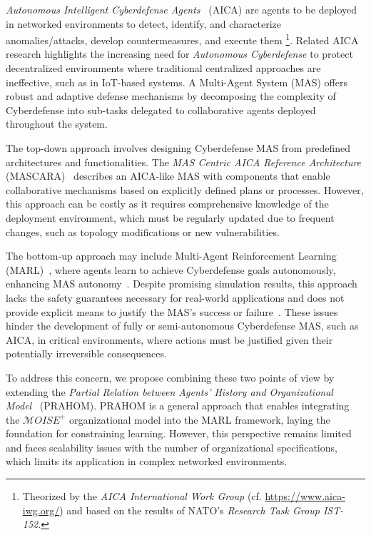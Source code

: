 \documentclass[conference]{IEEEtran}
\begin{document}
\textit{Autonomous Intelligent Cyberdefense Agents}~\cite{Kott2023} (AICA) are agents to be deployed in networked environments to detect, identify, and characterize anomalies/attacks, develop countermeasures, and execute them
%
\footnote{
    Theorized by the \textit{AICA International Work Group} (cf. \url{https://www.aica-iwg.org/}) and based on the results of NATO's \textit{Research Task Group IST-152}.
}.
Related AICA research highlights the increasing need for \textit{Autonomous Cyberdefense} to protect decentralized environments where traditional centralized approaches are ineffective, such as in IoT-based systems. A Multi-Agent System (MAS) offers robust and adaptive defense mechanisms by decomposing the complexity of Cyberdefense into sub-tasks delegated to collaborative agents deployed throughout the system.

The top-down approach involves designing Cyberdefense MAS from predefined architectures and functionalities. The \textit{MAS Centric AICA Reference Architecture} (MASCARA)~\cite{Kott2023} describes an AICA-like MAS with components that enable collaborative mechanisms based on explicitly defined plans or processes. However, this approach can be costly as it requires comprehensive knowledge of the deployment environment, which must be regularly updated due to frequent changes, such as topology modifications or new vulnerabilities.

The bottom-up approach may include Multi-Agent Reinforcement Learning (MARL)~\cite{Albrecht2024}, where agents learn to achieve Cyberdefense goals autonomously, enhancing MAS autonomy~\cite{hammar_stadle4_noms_23}. Despite promising simulation results, this approach lacks the safety guarantees necessary for real-world applications and does not provide explicit means to justify the MAS's success or failure~\cite{dulacarnold2019}. These issues hinder the development of fully or semi-autonomous Cyberdefense MAS, such as AICA, in critical environments, where actions must be justified given their potentially irreversible consequences.

To address this concern, we propose combining these two points of view by extending the \textit{Partial Relation between Agents' History and Organizational Model}~\cite{soule2024} (PRAHOM). PRAHOM is a general approach that enables integrating the $\mathcal{M}OISE^+$ organizational model into the MARL framework, laying the foundation for constraining learning. However, this perspective remains limited and faces scalability issues with the number of organizational specifications, which limits its application in complex networked environments.
\end{document}

